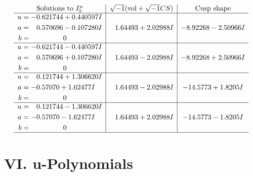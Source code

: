 \documentclass[1p]{elsarticle_modified}
\theoremstyle{definition}
\newcommand{\I}{\sqrt{-1}}
\begin{document}
$$\begin{array}{c|c|c}  
\text{Solutions to }I^u_{5}& \I (\text{vol} + \sqrt{-1}CS) & \text{Cusp shape}\\
 \hline 
\begin{aligned}
u &= -0.621744 + 0.440597 I \\
a &= \phantom{-}0.570696 - 0.107280 I \\
b &= \phantom{-0.000000 } 0\end{aligned}
 & \phantom{-}1.64493 + 2.02988 I & -8.92268 - 2.50966 I \\ \hline\begin{aligned}
u &= -0.621744 - 0.440597 I \\
a &= \phantom{-}0.570696 + 0.107280 I \\
b &= \phantom{-0.000000 } 0\end{aligned}
 & \phantom{-}1.64493 - 2.02988 I & -8.92268 + 2.50966 I \\ \hline\begin{aligned}
u &= \phantom{-}0.121744 + 1.306620 I \\
a &= -0.57070 + 1.62477 I \\
b &= \phantom{-0.000000 } 0\end{aligned}
 & \phantom{-}1.64493 - 2.02988 I & -14.5773 + 1.8205 I \\ \hline\begin{aligned}
u &= \phantom{-}0.121744 - 1.306620 I \\
a &= -0.57070 - 1.62477 I \\
b &= \phantom{-0.000000 } 0\end{aligned}
 & \phantom{-}1.64493 + 2.02988 I & -14.5773 - 1.8205 I\\
 \hline 
 \end{array}$$\newpage
\newpage\renewcommand{\arraystretch}{1}
\centering \section*{ VI. u-Polynomials}
\end{document}
